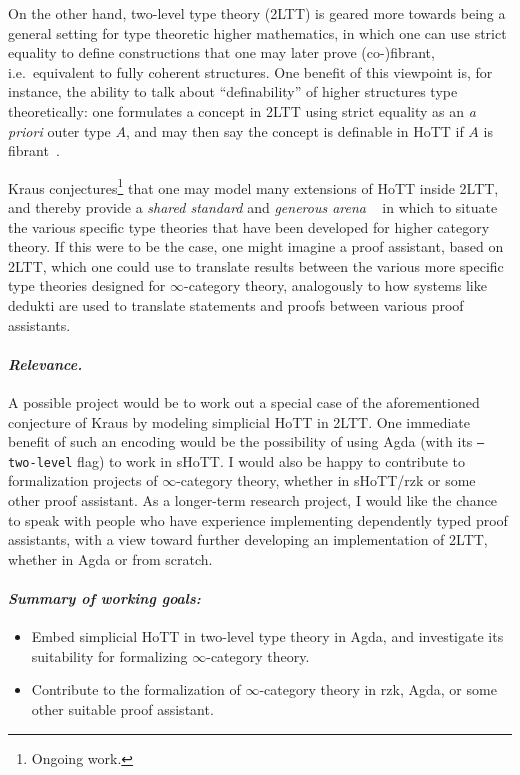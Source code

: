 \documentclass[a4paper]{article}
\begin{document}
On the other hand, two-level type theory (2LTT) is geared more towards being a general setting for type theoretic higher mathematics, in which one can use strict equality to define constructions that one may later prove (co-)fibrant, i.e.\ equivalent to fully coherent structures.
One benefit of this viewpoint is, for instance, the ability to talk about ``definability'' of higher structures type theoretically: one formulates a concept in 2LTT using strict equality as an \emph{a priori} outer type $A$, and may then say the concept is definable in HoTT if $A$ is fibrant~\cite{acks:23:2ltt}.

Kraus conjectures\footnote{Ongoing work.} that one may model many extensions of HoTT inside 2LTT, and thereby provide a \emph{shared standard} and \emph{generous arena} ~\cite{maddy:19:what-do-we-want} in which to situate the various specific type theories that have been developed for higher category theory.
If this were to be the case, one might imagine a proof assistant, based on 2LTT, which one could use to translate results between the various more specific type theories designed for $\infty$-category theory, analogously to how systems like dedukti are used to translate statements and proofs between various proof assistants.

\paragraph{\normalfont\textit{Relevance.}} A possible project would be to work out a special case of the aforementioned conjecture of Kraus by modeling simplicial HoTT in 2LTT.
One immediate benefit of such an encoding would be the possibility of using Agda (with its \texttt{--two-level} flag) to work in sHoTT.
I would also be happy to contribute to formalization projects of $\infty$-category theory, whether in sHoTT/rzk or some other proof assistant.
As a longer-term research project, I would like the chance to speak with people who have experience implementing dependently typed proof assistants, with a view toward further developing an implementation of 2LTT, whether in Agda or from scratch.

\paragraph{\normalfont\textit{Summary of working goals:}}
\begin{itemize}
    \item Embed simplicial HoTT in two-level type theory in Agda, and investigate its suitability for formalizing $\infty$-category theory.
    \item Contribute to the formalization of $\infty$-category theory in rzk, Agda, or some other suitable proof assistant.
\end{itemize}



\printbibliography[heading=subbibliography]
\end{document}
